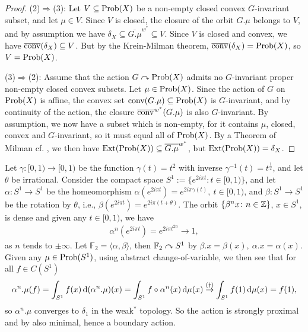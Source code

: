 \begin{proposition}
\begin{proof}
\noindent (2)$\Rightarrow$(3): Let $V \subseteq \operatorname{Prob}(X)$ be a non-empty closed convex $G$-invariant subset, and let $\mu \in V$. Since $V$ is closed, the closure of the orbit $G.\mu$ belongs to $V$, and by assumption we have $\delta_X \subseteq \overline{G.\mu}^{w^*} \subseteq V$. Since $V$ is closed and convex, we have $\overline{\operatorname{conv}}(\delta_X) \subseteq V$. But by the Krein-Milman theorem, $\overline{\operatorname{conv}}(\delta_X)=\operatorname{Prob}(X)$, so $V= \operatorname{Prob}(X)$.

\noindent (3)$\Rightarrow$(2): Assume that the action $G \curvearrowright \operatorname{Prob}(X)$ admits no $G$-invariant proper non-empty closed convex subsets. Let $\mu \in \operatorname{Prob}(X)$. Since the action of $G$ on $\operatorname{Prob}(X)$ is affine, the convex set $\operatorname{conv}(G.\mu) \subseteq \operatorname{Prob}(X)$ is $G$-invariant, and by continuity of the action, the closure $\overline{\operatorname{conv}}^{w^*}(G.\mu)$ is also $G$-invariant. By assumption, we now have a subset which is non-empty, for it contains $\mu$, closed, convex and $G$-invariant, so it must equal all of $\operatorname{Prob}(X)$. By a Theorem of Milman cf. \cite[Theorem 3.25][76]{rudin1991functional}, we then have $\operatorname{Ext}(\operatorname{Prob}(X)) \subseteq \overline{G.\mu}^{w^*}$, but $\operatorname{Ext}(\operatorname{Prob}(X))=\delta_X$.
\end{proof}
\end{proposition}

\begin{example}
Let $\gamma \colon [0,1) \to [0,1)$ be the function $\gamma(t)=t^2$ with inverse $\gamma^{-1}(t)=t^{\frac12}$, and let $\theta$ be irrational. Consider the compact space $S^1:= \{e^{2 i \pi t} \colon t \in [0,1)\}$, and let $\alpha \colon S^1 \to S^1$ be the homeomorphism $\alpha(e^{2i \pi t})=e^{2i\pi \gamma(t)},\ t \in [0,1)$, and $\beta \colon S^1 \to S^1$ be the rotation by $\theta$, i.e., $\beta\left(e^{2i \pi t}\right)= e^{2 i \pi (t+\theta)}$. The orbit $\{ \beta^n x \colon n \in \mathbb{Z}\}$, $x \in S^1$, is dense and given any $t \in [0,1)$, we have
\begin{align*}
\alpha^n(e^{2i\pi t})=e^{2 i \pi t^{2n}} \to 1, \tag{$\dagger$}
\end{align*}
as $n$ tends to $\pm \infty$. Let $\mathbb{F}_{2}=\langle \alpha, \beta\rangle$, then $\mathbb{F}_2 \curvearrowright S^1$ by $\beta.x= \beta(x), \ \alpha.x=\alpha(x)$. Given any $\mu \in \operatorname{Prob}(S^1)$, using abstract change-of-variable, we then see that for all $f \in C(S^1)$
\begin{align*}
\alpha^n.\mu(f)= \int_{S^1} f(x) \mathop{}\!\mathrm{d} (\alpha^n.\mu)(x) =\int_{S^1} f\circ \alpha^{n}(x) \mathop{}\!\mathrm{d} \mu(x)  \stackrel{(\dagger)}{\to} \int_{S^1} f(1) \mathop{}\!\mathrm{d} \mu(x) = f(1),
\end{align*}
so $\alpha^n . \mu$ converges to $\delta_1$ in the weak$^*$ topology. So the action is strongly proximal and by  also minimal, hence a boundary action.
\end{example}

